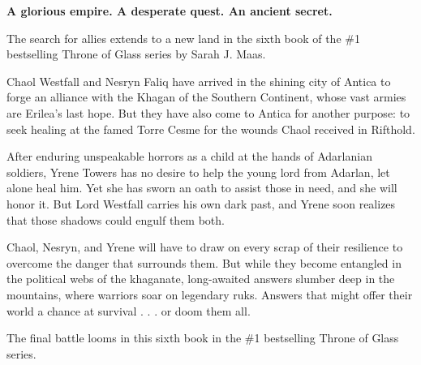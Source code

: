 
\newpage
\vspace*{2in}
\begin{Center} %

    \hfill \break
    \textbf{A glorious empire. A desperate quest. An ancient secret.}

    \hfill \break
    The search for allies extends to a new land in the sixth book of the \#1 bestselling Throne of Glass series by Sarah J. Maas.          
    
    \hfill \break     
    Chaol Westfall and Nesryn Faliq have arrived in the shining city of Antica to forge an alliance with the Khagan of the Southern Continent, whose vast armies are Erilea's last hope. But they have also come to Antica for another purpose: to seek healing at the famed Torre Cesme for the wounds Chaol received in Rifthold.          
    
    \hfill \break     
    After enduring unspeakable horrors as a child at the hands of Adarlanian soldiers, Yrene Towers has no desire to help the young lord from Adarlan, let alone heal him. Yet she has sworn an oath to assist those in need, and she will honor it. But Lord Westfall carries his own dark past, and Yrene soon realizes that those shadows could engulf them both.          
    
    \hfill \break     
    Chaol, Nesryn, and Yrene will have to draw on every scrap of their resilience to overcome the danger that surrounds them. But while they become entangled in the political webs of the khaganate, long-awaited answers slumber deep in the mountains, where warriors soar on legendary ruks. Answers that might offer their world a chance at survival . . . or doom them all.          
    
    \hfill \break     
    The final battle looms in this sixth book in the \#1 bestselling Throne of Glass series.
\end{Center}
\vspace*{\fill}
